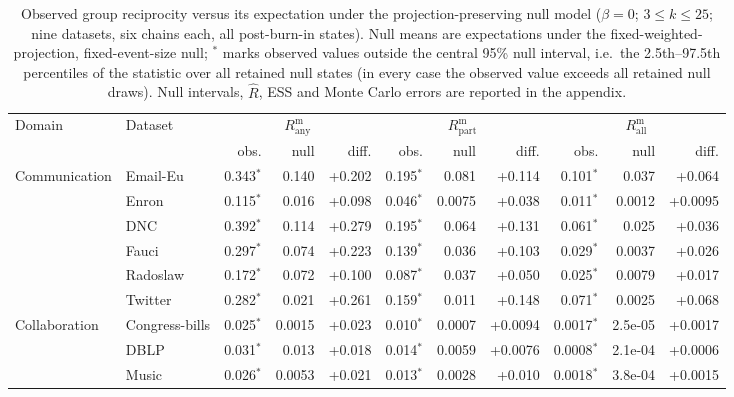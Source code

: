 \begin{table}[t]
\centering
\caption{Observed group reciprocity versus its expectation under the projection-preserving null model ($\beta=0$; $3\le k\le 25$; nine datasets, six chains each, all post-burn-in states). Null means are expectations under the fixed-weighted-projection, fixed-event-size null; $^{*}$ marks observed values outside the central 95\% null interval, i.e.\ the 2.5th--97.5th percentiles of the statistic over all retained null states (in every case the observed value exceeds all retained null draws). Null intervals, $\widehat R$, ESS and Monte Carlo errors are reported in the appendix.}
\label{tab:null-main}
\small
\begin{tabular}{llrrrrrrrrr}
\toprule
Domain & Dataset & \multicolumn{3}{c}{$R^{\mathrm m}_{\mathrm{any}}$} & \multicolumn{3}{c}{$R^{\mathrm m}_{\mathrm{part}}$} & \multicolumn{3}{c}{$R^{\mathrm m}_{\mathrm{all}}$} \\
 & & obs. & null & diff. & obs. & null & diff. & obs. & null & diff. \\
\midrule
Communication & Email-Eu & 0.343$^{*}$ & 0.140 & +0.202 & 0.195$^{*}$ & 0.081 & +0.114 & 0.101$^{*}$ & 0.037 & +0.064 \\
 & Enron & 0.115$^{*}$ & 0.016 & +0.098 & 0.046$^{*}$ & 0.0075 & +0.038 & 0.011$^{*}$ & 0.0012 & +0.0095 \\
 & DNC & 0.392$^{*}$ & 0.114 & +0.279 & 0.195$^{*}$ & 0.064 & +0.131 & 0.061$^{*}$ & 0.025 & +0.036 \\
 & Fauci & 0.297$^{*}$ & 0.074 & +0.223 & 0.139$^{*}$ & 0.036 & +0.103 & 0.029$^{*}$ & 0.0037 & +0.026 \\
 & Radoslaw & 0.172$^{*}$ & 0.072 & +0.100 & 0.087$^{*}$ & 0.037 & +0.050 & 0.025$^{*}$ & 0.0079 & +0.017 \\
 & Twitter & 0.282$^{*}$ & 0.021 & +0.261 & 0.159$^{*}$ & 0.011 & +0.148 & 0.071$^{*}$ & 0.0025 & +0.068 \\
\midrule
Collaboration & Congress-bills & 0.025$^{*}$ & 0.0015 & +0.023 & 0.010$^{*}$ & 0.0007 & +0.0094 & 0.0017$^{*}$ & 2.5e-05 & +0.0017 \\
 & DBLP & 0.031$^{*}$ & 0.013 & +0.018 & 0.014$^{*}$ & 0.0059 & +0.0076 & 0.0008$^{*}$ & 2.1e-04 & +0.0006 \\
 & Music & 0.026$^{*}$ & 0.0053 & +0.021 & 0.013$^{*}$ & 0.0028 & +0.010 & 0.0018$^{*}$ & 3.8e-04 & +0.0015 \\
\bottomrule
\end{tabular}
\end{table}
